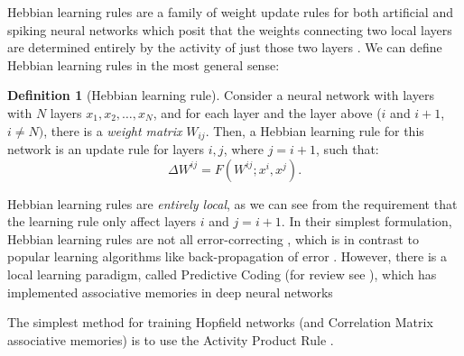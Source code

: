\documentclass{article}
\theoremstyle{definition}
\newtheorem{definition}{Definition}[subsection]
\begin{document}
Hebbian learning rules are a family of weight update rules for both
artificial and spiking neural networks which posit that
the weights connecting two local layers are determined entirely
by the activity of just those two layers
\parencites{hebb_organization_1949,sejnowski_hebb_1989}.
We can define Hebbian learning rules in the most general sense:
\begin{definition}[Hebbian learning rule]\label{def:hebbian-learning-rule}
  Consider a neural network with layers with $N$ layers $x_{1}, x_2,
  \dots, x_N$,
  and for each layer and the layer above ($i$ and $i + 1$, $i \neq N)$, there
  is a \textit{weight matrix} $W_{ij}$. Then, a Hebbian learning rule for this
  network is an update rule for layers $i, j$, where $j = i + 1$, such that:
  \begin{equation}
    \Delta W^{ij} = F(W^{ij}; x^i, x^j).
  \end{equation}
\end{definition}

Hebbian learning rules are \textit{entirely local}, as we can see from
the requirement that the learning rule only affect layers $i$ and $j = i + 1$.
In their simplest formulation, Hebbian learning rules are not
all error-correcting \parencite{munakata_how_2006}, 
which is in contrast to popular learning algorithms
like back-propagation of error \parencite{rumelhart_learning_1986}. However,
there is a local learning paradigm, called Predictive Coding (for review see
\textcite{spratling_review_2017}), which
has implemented associative memories in deep neural networks
\parencite{salvatori_associative_2021}

The simplest method for training Hopfield networks (and Correlation Matrix associative
memories) is to use the Activity Product Rule \parencite{haykin_neural_2009}.
\end{document}
